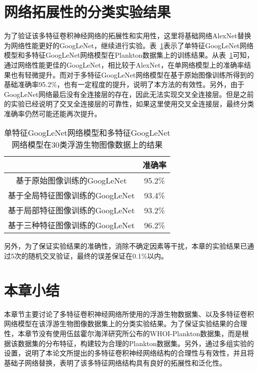 \section{网络拓展性的分类实验结果}
为了验证该多特征卷积神经网络的拓展性和实用性，这里将基础网络AlexNet替换为网络性能更好的GoogLeNet，继续进行实验。表~\ref{tab:google}表示了单特征GoogLeNet网络模型和多特征GoogLeNet网络模型在Plankton数据集上的训练结果。从表~\ref{tab:google}可知，通过网络性能更佳的GoogLeNet，相比较于AlexNet，在单网络模型上的准确率结果也有轻微提升。而对于多特征GoogLeNet网络模型在基于原始图像训练所得到的基础准确率95.2\%，也有一定程度的提升，说明了本方法的有效性。另外，由于GoogLeNet网络最后没有全连接层的存在，因此无法实现交叉全连接层。但是之前的实验已经说明了交叉全连接层的可靠性，如果这里使用交叉全连接层，最终分类准确率仍然可能还能再次提升。

\begin{table}[H]
\centering
\caption{单特征GoogLeNet网络模型和多特征GoogLeNet网络模型在30类浮游生物图像数据上的结果}
\label{tab:google}
\begin{tabular}{|c|c|}%
\hline
\centering{网络模型} & 准确率 \\
\hline
基于原始图像训练的GoogLeNet & 95.2\% \\ 
\hline
基于全局特征图像训练的GoogLeNet  & 93.4\% \\ 
\hline
基于局部特征图像训练的GoogLeNet  & 93.2\% \\
\hline
基于三种特征图像训练的GoogLeNet  & 96.2\% \\
\hline
\end{tabular}
\end{table}

另外，为了保证实验结果的准确性，消除不确定因素等干扰，本章的实验结果已通过5次的随机交叉验证，最终的误差保证在0.1\%以内。

\section{本章小结}

本章节主要讨论了多特征卷积神经网络所使用的浮游生物数据集、以及多特征卷积网络模型在该浮游生物图像数据集上的分类实验结果。为了保证实验结果的合理性，本章节没有使用伍兹霍尔海洋研究所公布的WHOI-Plankton数据集，而是根据该数据集的分布特征，构建较为合理的Plankton数据集。另外，通过多组实验的设置，说明了本论文所提出的多特征卷积神经网络结构的合理性与有效性，并且将基础子网络替换，表明了该多特征网络结构具有良好的拓展性和泛化性。


